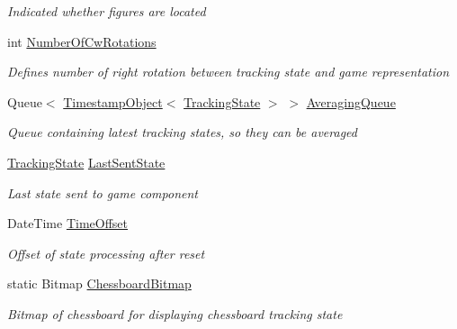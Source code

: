 \begin{DoxyCompactItemize}
\begin{DoxyCompactList}\small\item\em Indicated whether figures are located \end{DoxyCompactList}\item 
int \mbox{\hyperlink{class_chess_tracking_1_1_controlling_elements_1_1_tracking_result_processing_a4357e34eaead8ea88000b7fbd6abcbbf}{Number\+Of\+Cw\+Rotations}}
\begin{DoxyCompactList}\small\item\em Defines number of right rotation between tracking state and game representation \end{DoxyCompactList}\item 
Queue$<$ \mbox{\hyperlink{class_chess_tracking_1_1_utils_1_1_timestamp_object}{Timestamp\+Object}}$<$ \mbox{\hyperlink{class_chess_tracking_1_1_multithreading_messages_1_1_tracking_state}{Tracking\+State}} $>$ $>$ \mbox{\hyperlink{class_chess_tracking_1_1_controlling_elements_1_1_tracking_result_processing_ae623e3cb7448247b3c511e958303f812}{Averaging\+Queue}}
\begin{DoxyCompactList}\small\item\em Queue containing latest tracking states, so they can be averaged \end{DoxyCompactList}\item 
\mbox{\hyperlink{class_chess_tracking_1_1_multithreading_messages_1_1_tracking_state}{Tracking\+State}} \mbox{\hyperlink{class_chess_tracking_1_1_controlling_elements_1_1_tracking_result_processing_af1a5be357e46d77d148e66c1d681b0b1}{Last\+Sent\+State}}
\begin{DoxyCompactList}\small\item\em Last state sent to game component \end{DoxyCompactList}\item 
Date\+Time \mbox{\hyperlink{class_chess_tracking_1_1_controlling_elements_1_1_tracking_result_processing_a6fe93de6d0d1bf9d0bb6165fc68be873}{Time\+Offset}}
\begin{DoxyCompactList}\small\item\em Offset of state processing after reset \end{DoxyCompactList}\item 
static Bitmap \mbox{\hyperlink{class_chess_tracking_1_1_controlling_elements_1_1_tracking_result_processing_a52b452d08234617de3c42e8578577927}{Chessboard\+Bitmap}}
\begin{DoxyCompactList}\small\item\em Bitmap of chessboard for displaying chessboard tracking state \end{DoxyCompactList}\end{DoxyCompactItemize}
